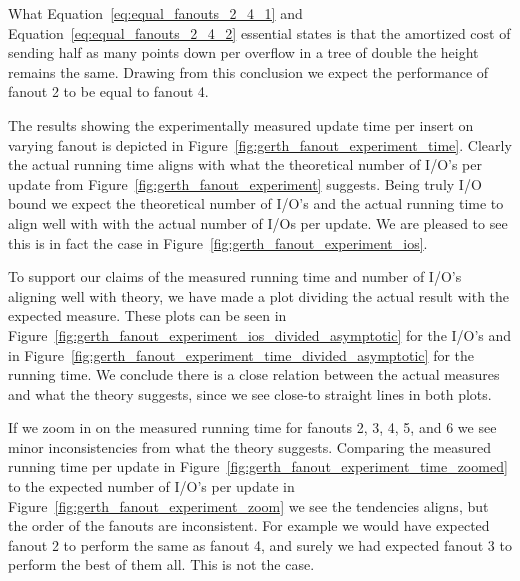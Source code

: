 \documentclass[twoside,11pt,openright]{report}
\begin{document}
What Equation~\ref{eq:equal_fanouts_2_4_1} and Equation~\ref{eq:equal_fanouts_2_4_2} essential states is that the amortized cost of sending half as many points down per overflow in a tree of double the height remains the same. Drawing from this conclusion we expect the performance of fanout 2 to be equal to fanout 4.

The results showing the experimentally measured update time per insert on varying fanout is depicted in Figure~\ref{fig:gerth_fanout_experiment_time}. Clearly the actual running time aligns with what the theoretical number of I/O's per update from Figure~\ref{fig:gerth_fanout_experiment} suggests. Being truly I/O bound we expect the theoretical number of I/O's and the actual running time to align well with with the actual number of I/Os per update. We are pleased to see this is in fact the case in Figure~\ref{fig:gerth_fanout_experiment_ios}.

To support our claims of the measured running time and number of I/O's aligning well with theory, we have made a plot dividing the actual result with the expected measure. These plots can be seen in Figure~\ref{fig:gerth_fanout_experiment_ios_divided_asymptotic} for the I/O's and in Figure~\ref{fig:gerth_fanout_experiment_time_divided_asymptotic} for the running time. We conclude there is a close relation between the actual measures and what the theory suggests, since we see close-to straight lines in both plots.

If we zoom in on the measured running time for fanouts 2, 3, 4, 5, and 6 we see minor inconsistencies from what the theory suggests. Comparing the measured running time per update in Figure~\ref{fig:gerth_fanout_experiment_time_zoomed} to the expected number of I/O's per update in Figure~\ref{fig:gerth_fanout_experiment_zoom} we see the tendencies aligns, but the order of the fanouts are inconsistent. For example we would have expected fanout 2 to perform the same as fanout 4, and surely we had expected fanout 3 to perform the best of them all. This is not the case.
\end{document}
